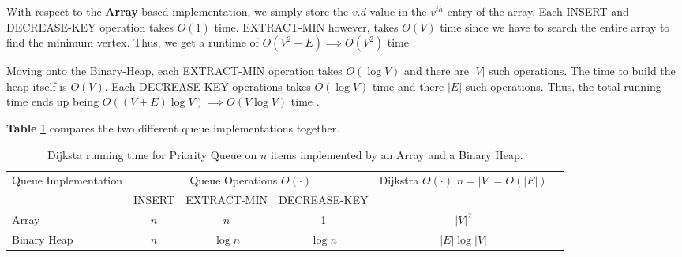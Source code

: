 \documentclass[a4paper, 12pt]{report}
\theoremstyle{definition}
\begin{document}
With respect to the \textbf{Array}-based implementation, we simply store the \(v.d\) value in the \(v^{th}\) entry of the array. Each INSERT and 
DECREASE-KEY operation takes \(O(1)\) time. EXTRACT-MIN however, takes \(O(V)\) time since we have to search the entire array to find the minimum vertex.
Thus, we get a runtime of $O(V^{2} + E) \implies O(V^{2})$ time \cite{cormenBk,stand:bford:12,ocw:2020}.

Moving onto the Binary-Heap, each EXTRACT-MIN operation takes \(O(\log V)\) and there are \(|V|\) such operations. 
The time to build the heap itself is \(O(V)\). Each DECREASE-KEY operations takes \(O(\log V)\) time and there \(|E|\) such operations. Thus, the total 
running time ends up being $O((V + E) \log V) \implies O(V\log V)$ time \cite{cormenBk,stand:bford:12,ocw:2020}. 

\textbf{Table} \ref{tab2:dijkstra} compares the two different queue implementations together.

\begin{table}[H]
  \begin{center}
    \begin{tabular}{|l|*{5}{c|}}
      \hline
      \multirow{2}{8em}{Queue Implementation} & \multicolumn{3}{|c|}{Queue Operations \(O(\cdot)\)} &  \multirow{2}{8em}{Dijkstra \(O(\cdot)\) \(n = |V| = O(|E|)\)}\\ \cline{2-4}
      & \footnotesize INSERT & \footnotesize EXTRACT-MIN & \footnotesize DECREASE-KEY & \\ \hline
      Array & \cellcolor{red!25} \(n\) & \cellcolor{red!25} \(n\) & \cellcolor{blue!50} 1 & $|V|^{2}$ \\ \hline
      Binary Heap & \cellcolor{red!25} \(n\) & \cellcolor{blue!25} \(\log n\) & \cellcolor{blue!25} \(\log n\) & $|E|\log |V|$ \\
      \hline
    \end{tabular}
  \end{center}
  \caption{Dijksta running time for Priority Queue on \(n\) items implemented by an Array and a Binary Heap. \cite{ocw:2020}}
  \label{tab2:dijkstra}
\end{table}
\end{document}
